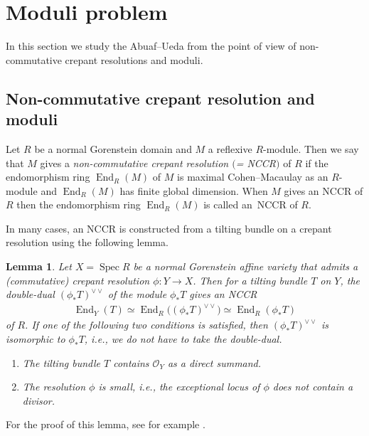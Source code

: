 \documentclass[10pt,a4paper]{amsart}
\DeclareMathOperator{\End}{End}
\DeclareMathOperator{\Spec}{Spec}
\newcommand{\stsh}{\mathcal{O}}
\numberwithin{equation}{section}
\newtheorem{Lemma}[Theorem]{Lemma}
\begin{document}
\section{Moduli problem}

In this section we study the Abuaf--Ueda from the point of view of non-commutative crepant resolutions and moduli.

\subsection{Non-commutative crepant resolution and moduli}

\begin{Definition}
Let $R$ be a normal Gorenstein domain and $M$ a reflexive $R$-module.
Then we say that $M$ gives a \textit{non-commutative crepant resolution $($= NCCR$)$} of $R$
if the endomorphism ring $\End_R(M)$ of $M$ is maximal Cohen--Macaulay as an $R$-module and
$\End_R(M)$ has finite global dimension.
When $M$ gives an NCCR of $R$ then the endomorphism ring $\End_R(M)$ is called an~NCCR of $R$.
\end{Definition}

In many cases, an NCCR is constructed from a tilting bundle on a crepant resolution
using the following lemma.

\begin{Lemma}
Let $X = \Spec R$ be a normal Gorenstein affine variety that admits a (commutative) crepant resolution $\phi\colon Y \to X$.
Then for a tilting bundle $T$ on $Y$,
the double-dual $(\phi_* T)^{\vee \vee}$ of the module $\phi_* T$ gives an NCCR
\begin{gather*}
\End_Y(T) \simeq \End_R\big((\phi_* T)^{\vee\vee}\big) \simeq \End_R(\phi_* T)
\end{gather*}
 of $R$.
If one of the following two conditions is satisfied, then $(\phi_* T)^{\vee \vee}$ is isomorphic to $\phi_* T$,
i.e., we do not have to take the double-dual.
\begin{enumerate}\itemsep=0pt
\item[$(a)$] The tilting bundle $T$ contains $\stsh_Y$ as a direct summand.
\item[$(b)$] The resolution $\phi$ is small, i.e., the exceptional locus of $\phi$ does not contain a divisor.
\end{enumerate}
\end{Lemma}

For the proof of this lemma, see for example \cite[Section 2]{H17c}.
\end{document}
